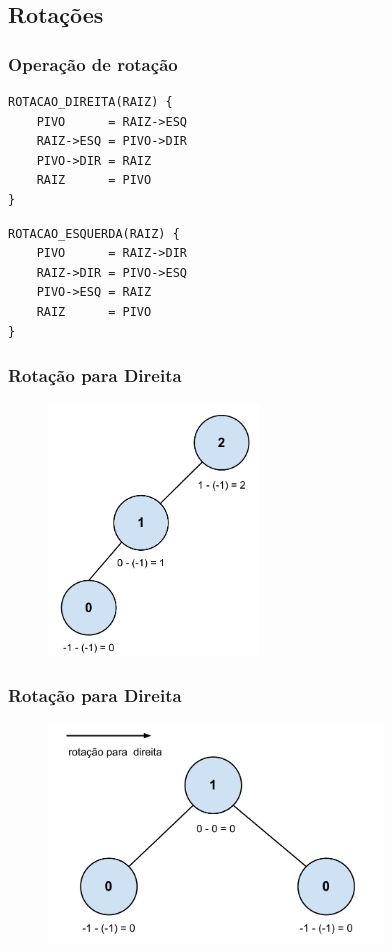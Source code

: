 \subsection{Rotações}

\begin{frame}[fragile]
\frametitle{Operação de rotação}

\begin{verbatim}
ROTACAO_DIREITA(RAIZ) {
    PIVO      = RAIZ->ESQ
    RAIZ->ESQ = PIVO->DIR
    PIVO->DIR = RAIZ
    RAIZ      = PIVO
}
\end{verbatim}

\begin{verbatim}
ROTACAO_ESQUERDA(RAIZ) {
    PIVO      = RAIZ->DIR
    RAIZ->DIR = PIVO->ESQ
    PIVO->ESQ = RAIZ
    RAIZ      = PIVO
}
\end{verbatim}
\end{frame}

\begin{frame}
    \frametitle{Rotação para Direita}
    
    \begin{figure}[tbp]
    \includegraphics[keepaspectratio=true,width=2.2in]{figs/fig_arvores/Balanceamento_Arvore2}
    \centering
    \end{figure}
\end{frame}

\begin{frame}
    \frametitle{Rotação para Direita}
    
    \begin{figure}[tbp]
    \includegraphics[keepaspectratio=true,width=3.5in]{figs/fig_arvores/Balanceamento_Arvore3}
    \centering
    \end{figure}
\end{frame}


